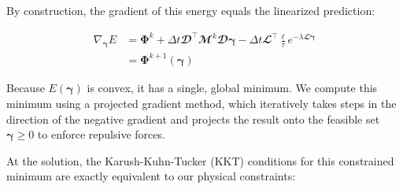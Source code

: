 \documentclass[conference]{IEEEtran}
\begin{document}
By construction, the gradient of this energy equals the linearized prediction:

\begin{equation}
    \begin{split}
        \nabla_{\boldsymbol{\gamma}} E & = \boldsymbol{\Phi}^k + \Delta t \mathbfcal{D}^\top \mathbfcal{M}^k \mathbfcal{D} \boldsymbol{\gamma} - \Delta t \mathbfcal{L}^\top \frac{\boldsymbol{\ell}}{\tau} e^{-\lambda \mathbfcal{L} \boldsymbol{\gamma}} \\
        & = \boldsymbol{\Phi}^{k+1}(\boldsymbol{\gamma})
    \end{split}
\end{equation}

Because $E(\boldsymbol{\gamma})$ is convex, it has a single, global minimum. We compute this minimum using a projected gradient method, which iteratively takes steps in the direction of the negative gradient and projects the result onto the feasible set $\boldsymbol{\gamma} \geq 0$ to enforce repulsive forces.

At the solution, the Karush-Kuhn-Tucker (KKT) conditions for this constrained minimum are exactly equivalent to our physical constraints:
\end{document}
